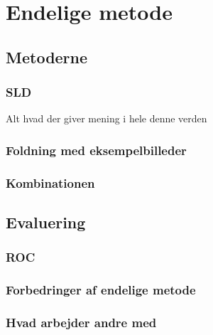 \section{Endelige metode}
\subsection{Metoderne}
\subsubsection{SLD}	%
Alt hvad der giver mening i hele denne verden
\subsubsection{Foldning med eksempelbilleder} %
\subsubsection{Kombinationen} %
\subsection{Evaluering}
\subsubsection{ROC}
\subsubsection{Forbedringer af endelige metode}
\subsubsection{Hvad arbejder andre med} %
